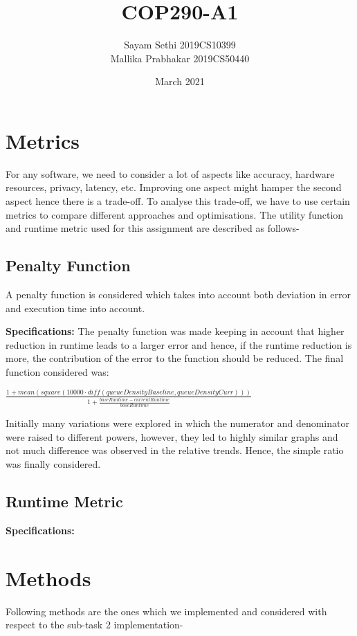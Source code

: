 \documentclass{article}
\title{COP290-A1}
\author{Sayam Sethi 2019CS10399 \\ Mallika Prabhakar 2019CS50440 }
\date{March 2021}
\newcommand\ddfrac[2]{{\displaystyle\frac{\displaystyle #1}{\displaystyle #2}}}
\begin{document}
\maketitle

\section{Metrics}
For any software, we need to consider a lot of aspects like accuracy, hardware resources, privacy, latency, etc. Improving one aspect might hamper the second aspect hence there is a trade-off. To analyse this trade-off, we have to use certain metrics to compare different approaches and optimisations. The utility function and runtime metric used for this assignment are described as follows-

\subsection{Penalty Function}
A penalty function is considered which takes into account both deviation in error and execution time into account.

\textbf{Specifications:} The penalty function was made keeping in account that higher reduction in runtime leads to a larger error and hence, if the runtime reduction is more, the contribution of the error to the function should be reduced. The final function considered was:
\begin{center}
    $\ddfrac{1 + \mathit{mean}(\mathit{square}(10000\cdot\mathit{diff}(\mathit{queueDensityBaseline}, \mathit{queueDensityCurr})))}{1 + \frac{\mathit{baseRuntime} - \mathit{currentRuntime}}{\mathit{baseRuntime}}}$
\end{center}
Initially many variations were explored in which the numerator and denominator were raised to different powers, however, they led to highly similar graphs and not much difference was observed in the relative trends. Hence, the simple ratio was finally considered.

\subsection{Runtime Metric}
\textbf{Specifications:}


\section{Methods}
Following methods are the ones which we implemented and considered with respect to the sub-task 2 implementation-
\end{document}
